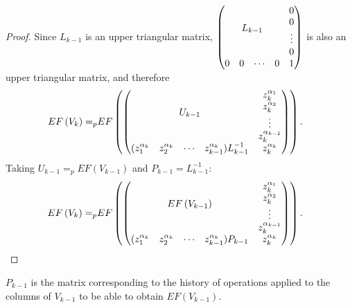 \documentclass[11pt]{llncs}
\begin{document}
\begin{proof}
    
    Since $L_{k-1}$ is an upper triangular matrix, $ \begin{pmatrix}
            \multicolumn{4}{c}{\multirow{4}{*}{$L_{k-1}$}} & 0\\
            & & & & 0\\
            & & & & \vdots\\
            & & & & 0\\
            0 & 0& \cdots & 0 & 1
        \end{pmatrix}$ is also an upper triangular matrix, and therefore
      \begin{align*}
        EF\left(V_{k}\right) =_p & EF
        \begin{pmatrix}
        \begin{pmatrix}
            \multicolumn{4}{c}{\multirow{4}{*}{$U_{k-1}$}} & z_k^{\alpha_1}\\
            & & & & z_k^{\alpha_2}\\
            & & & & \vdots\\
            & & & & z_{k}^{\alpha_{k-1}}\\
            (z_1^{\alpha_{k}} & z_2^{\alpha_{k}}& \cdots & z_{k-1}^{\alpha_{k}})L_{k-1}^{-1} & z_{k}^{\alpha_k}
        \end{pmatrix}
        \end{pmatrix}.
    \end{align*}
    Taking $U_{k-1} =_p EF\left(V_{k-1}\right)$ and $P_{k-1} = L_{k-1}^{-1}$:
    \begin{align*}
        EF\left(V_{k}\right) =_p & EF
        \begin{pmatrix}
        \begin{pmatrix}
            \multicolumn{4}{c}{\multirow{4}{*}{$EF\left(V_{k-1}\right)$}} & z_k^{\alpha_1}\\
            & & & & z_k^{\alpha_2}\\
            & & & & \vdots\\
            & & & & z_{k}^{\alpha_{k-1}}\\
            (z_1^{\alpha_{k}} & z_2^{\alpha_{k}}& \cdots & z_{k-1}^{\alpha_{k}})P_{k-1} & z_{k}^{\alpha_k}
        \end{pmatrix}
        \end{pmatrix}.
    \end{align*}
\end{proof}

\begin{remark}\label{rem:historyOfOperations}
    $P_{k-1}$ is the matrix corresponding to the history of operations applied to the columns of $V_{k-1}$ to be able to obtain $EF\left(V_{k-1}\right)$.
\end{remark}
\end{document}
